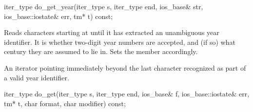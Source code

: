 %
%
\begin{itemdecl}
iter_type do_get_year(iter_type s, iter_type end, ios_base& str,
                      ios_base::iostate& err, tm* t) const;
\end{itemdecl}

\begin{itemdescr}
\pnum
\effects
Reads characters starting at 
until it has extracted an unambiguous year identifier.
It is
 whether
two-digit year numbers are accepted,
and (if so) what century they are assumed to lie in.
Sets the
member accordingly.

\pnum
\returns
An iterator pointing immediately beyond the last character recognized
as part of a valid year identifier.
\end{itemdescr}

%
%
\begin{itemdecl}
iter_type do_get(iter_type s, iter_type end, ios_base& f,
    ios_base::iostate& err, tm* t, char format, char modifier) const;
\end{itemdecl}


